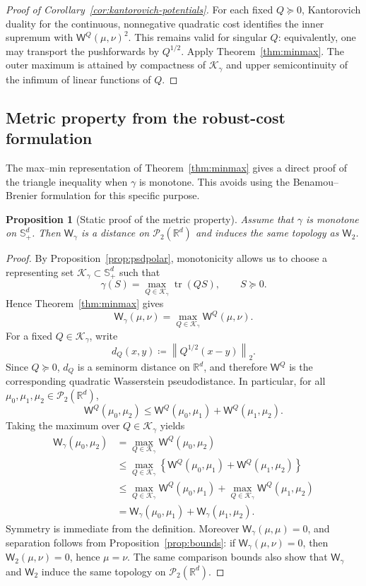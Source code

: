 \documentclass{article}
\newtheorem{proposition}[theorem]{Proposition}
\newcommand{\R}{\mathbb{R}}
\newcommand{\cP}{\mathcal{P}}
\newcommand{\Wtwo}{\mathsf{W}_2}
\newcommand{\Wg}{\mathsf{W}_{\gamma}}
\newcommand{\WQ}[1]{\mathsf{W}^{#1}}
\newcommand{\tr}{\operatorname{tr}}
\newcommand{\norm}[1]{\left\lVert #1 \right\rVert}
\newcommand{\cK}{\mathcal K_\gamma}
\begin{document}
\begin{proof}[Proof of Corollary~\ref{cor:kantorovich-potentials}]
For each fixed $Q\succeq0$, Kantorovich duality for the continuous,
nonnegative quadratic cost identifies the inner supremum with
$\WQ{Q}(\mu,\nu)^2$. This remains valid for singular $Q$: equivalently,
one may transport the pushforwards by $Q^{1/2}$. Apply
Theorem~\ref{thm:minmax}. The outer maximum is attained by compactness of
$\cK$ and upper semicontinuity of the infimum of linear functions of $Q$.
\end{proof}

\subsection{Metric property from the robust-cost formulation}
\label{subsec:metric-static}

The max--min representation of Theorem~\ref{thm:minmax} gives a direct proof
of the triangle inequality when $\gamma$ is monotone. This avoids using the
Benamou--Brenier formulation for this specific purpose.

\begin{proposition}[Static proof of the metric property]
\label{prop:metric-static}
Assume that $\gamma$ is monotone on $\mathbb S_+^d$. Then $\Wg$ is a distance
on $\cP_2(\R^d)$ and induces the same topology as $\Wtwo$.
\end{proposition}

\begin{proof}
By Proposition~\ref{prop:psdpolar}, monotonicity allows us to choose a
representing set $\cK\subset \mathbb S_+^d$ such that
\[
    \gamma(S)=\max_{Q\in\cK}\tr(QS),
    \qquad S\succeq0.
\]
Hence Theorem~\ref{thm:minmax} gives
\[
    \Wg(\mu,\nu)
    =
    \max_{Q\in\cK}\WQ{Q}(\mu,\nu).
\]
For a fixed $Q\in\cK$, write
\[
    d_Q(x,y)\coloneqq \norm{Q^{1/2}(x-y)}_2 .
\]
Since $Q\succeq0$, $d_Q$ is a seminorm distance on $\R^d$, and therefore
$\WQ{Q}$ is the corresponding quadratic Wasserstein pseudodistance. In
particular, for all $\mu_0,\mu_1,\mu_2\in\cP_2(\R^d)$,
\[
    \WQ{Q}(\mu_0,\mu_2)
    \le
    \WQ{Q}(\mu_0,\mu_1)+\WQ{Q}(\mu_1,\mu_2).
\]
Taking the maximum over $Q\in\cK$ yields
\[
\begin{aligned}
    \Wg(\mu_0,\mu_2)
    &=
    \max_{Q\in\cK}\WQ{Q}(\mu_0,\mu_2) \\
    &\le
    \max_{Q\in\cK}
    \left\{
        \WQ{Q}(\mu_0,\mu_1)+\WQ{Q}(\mu_1,\mu_2)
    \right\} \\
    &\le
    \max_{Q\in\cK}\WQ{Q}(\mu_0,\mu_1)
    +
    \max_{Q\in\cK}\WQ{Q}(\mu_1,\mu_2) \\
    &=
    \Wg(\mu_0,\mu_1)+\Wg(\mu_1,\mu_2).
\end{aligned}
\]
Symmetry is immediate from the definition. Moreover $\Wg(\mu,\mu)=0$, and
separation follows from Proposition~\ref{prop:bounds}: if $\Wg(\mu,\nu)=0$,
then $\Wtwo(\mu,\nu)=0$, hence $\mu=\nu$. The same comparison bounds also show
that $\Wg$ and $\Wtwo$ induce the same topology on $\cP_2(\R^d)$.
\end{proof}
\end{document}
